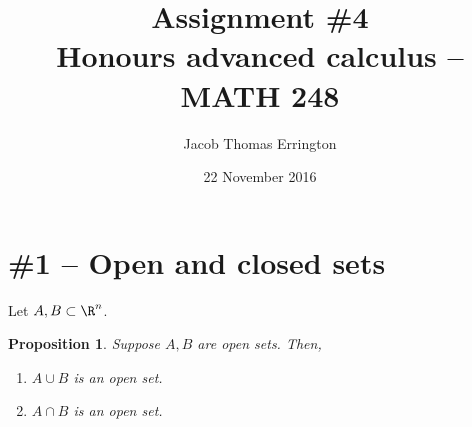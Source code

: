 \documentclass[letterpaper,11pt]{article}
\author{Jacob Thomas Errington}
\title{Assignment \#4\\Honours advanced calculus -- MATH 248}
\date{22 November 2016}
\newtheorem{prop}{Proposition}
\newcommand{\union}{\cup}
\newcommand{\intersn}{\cap}
\begin{document}
\maketitle

\section*{\#1 -- Open and closed sets}

Let $A, B \subset \R^n$.

\begin{prop}
  Suppose $A, B$ are open sets. Then,
  \begin{enumerate}
    \item $A \union B$ is an open set.
    \item $A \intersn B$ is an open set.
  \end{enumerate}
\end{prop}
\end{document}
